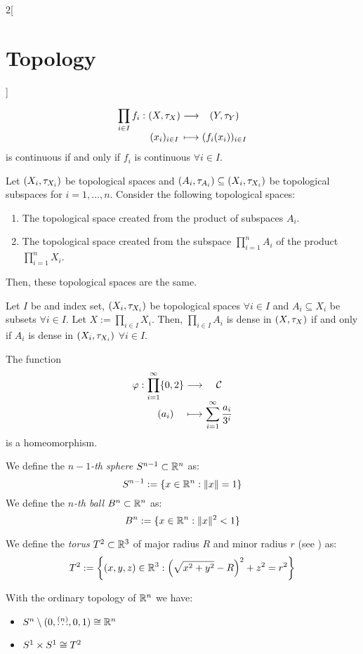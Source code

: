 \documentclass[../../../main_math.tex]{subfiles}
\begin{document}
\begin{multicols}{2}[\section{Topology}]
\begin{proposition}
    $$
      \function{\displaystyle\prod_{i\in I}f_i}{\left(X,\topo_X\right)}{\left(Y,\topo_Y\right)}{(x_i)_{i\in I}}{(f_i(x_i))_{i\in I}}
    $$ is continuous if and only if $f_i$ is continuous $\forall i\in I$.
  \end{proposition}
  \begin{proposition}
    Let $(X_i,\topo_{X_i})$ be topological spaces and $(A_i,\topo_{A_i})\subseteq (X_i,\topo_{X_i})$ be topological subspaces for $i=1,\ldots, n$. Consider the following topological spaces:
    \begin{enumerate}
      \item The topological space created from the product of subspaces $A_i$.
      \item The topological space created from the subspace $\prod_{i=1}^nA_i$ of the product $\prod_{i=1}^nX_i$.
    \end{enumerate}
    Then, these topological spaces are the same.
  \end{proposition}
  \begin{proposition}
    Let $I$ be and index set, $(X_i,\topo_{X_i})$ be topological spaces $\forall i\in I$ and $A_i\subseteq X_i$ be subsets $\forall i\in I$. Let $X:=\prod_{i\in I}X_i$. Then, $\prod_{i\in I}A_i$ is dense in $(X,\topo_X)$ if and only if $A_i$ is dense in $(X_i,\topo_{X_i})$ $\forall i\in I$.
  \end{proposition}
  \begin{theorem}
    The function
    $$
      \function{\varphi}{\displaystyle\prod_{i=1}^\infty\{0,2\}}{\mathcal{C}}{(a_i)}{\displaystyle\sum_{i=1}^\infty\frac{a_i}{3^i}}
    $$
    is a homeomorphism.
  \end{theorem}
  \begin{definition}
    We define the \emph{$n-1$-th sphere} $\S^{n-1}\subset \RR^n$ as: $$\S^{n-1}:=\{x\in\RR^n:\|x\|=1\}$$
    We define the \emph{$n$-th ball} $B^n\subset \RR^n$ as: $$B^n:=\{x\in\RR^n:\|x\|^2<1\}$$
  \end{definition}
  \begin{definition}[Torus]
    We define the \emph{torus} $T^2\subset \RR^3$ of major radius $R$ and minor radius $r$ (see ) as: $$T^2:=\left\{(x,y,z)\in\RR^3:{\left(\sqrt{x^2+y^2}-R\right)}^2+z^2=r^2\right\}$$
  \end{definition}
  \begin{center}
    \begin{minipage}{\linewidth}
      \centering
      
      \label{TOP:torus}
    \end{minipage}
  \end{center}
  \begin{proposition}
    With the ordinary topology of $\RR^n$ we have:
    \begin{itemize}
      \item $\S^n\setminus(0,\overset{(n)}{\ldots},0,1)\cong\RR^n$
      \item $\S^1\times \S^1\cong T^2$
    \end{itemize}
  \end{proposition}

\end{multicols}
\end{document}
